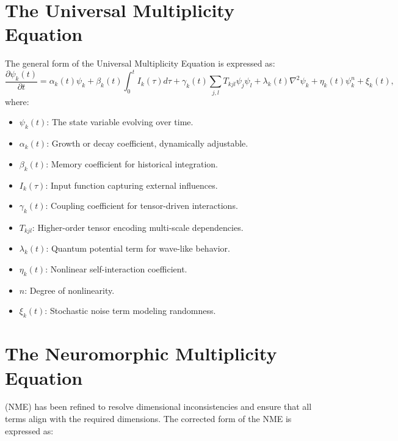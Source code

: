\documentclass{article}
\theoremstyle{plain}
\begin{document}
\begin{itemize}
\section{The Universal Multiplicity Equation}
The general form of the Universal Multiplicity Equation is expressed as:
\begin{equation}
\frac{\partial \psi_k(t)}{\partial t} = \alpha_k(t)\psi_k + \beta_k(t) \int_0^t I_k(\tau) d\tau + \gamma_k(t) \sum_{j,l} T_{kjl} \psi_j \psi_l + \lambda_k(t) \nabla^2 \psi_k + \eta_k(t) \psi_k^n + \xi_k(t),
\end{equation}
where:
\begin{itemize}
    \item $\psi_k(t)$: The state variable evolving over time.
    \item $\alpha_k(t)$: Growth or decay coefficient, dynamically adjustable.
    \item $\beta_k(t)$: Memory coefficient for historical integration.
    \item $I_k(\tau)$: Input function capturing external influences.
    \item $\gamma_k(t)$: Coupling coefficient for tensor-driven interactions.
    \item $T_{kjl}$: Higher-order tensor encoding multi-scale dependencies.
    \item $\lambda_k(t)$: Quantum potential term for wave-like behavior.
    \item $\eta_k(t)$: Nonlinear self-interaction coefficient.
    \item $n$: Degree of nonlinearity.
    \item $\xi_k(t)$: Stochastic noise term modeling randomness.
\end{itemize}

\section{The Neuromorphic Multiplicity Equation}(NME) has been refined to resolve dimensional inconsistencies and ensure that all terms align with the required dimensions. The corrected form of the NME is expressed as:


\end{itemize}
\end{document}
